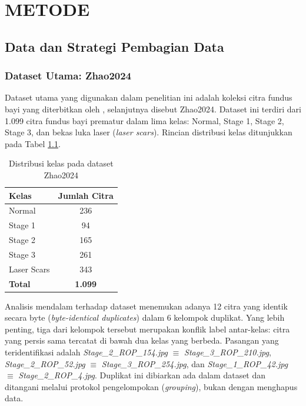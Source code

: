 
\chapter{METODE}

\section{Data dan Strategi Pembagian Data}

\subsection{Dataset Utama: Zhao2024}

Dataset utama yang digunakan dalam penelitian ini adalah koleksi citra fundus bayi yang
diterbitkan oleh \citet{Zhao2024}, selanjutnya disebut Zhao2024. Dataset ini terdiri dari
1.099 citra fundus bayi prematur dalam lima kelas: Normal, Stage 1, Stage 2, Stage 3, dan
bekas luka laser (\textit{laser scars}). Rincian distribusi kelas ditunjukkan pada Tabel
\ref{tab:distribusi_kelas}.

\begin{table}[H]
\centering
\caption{Distribusi kelas pada dataset Zhao2024}
\label{tab:distribusi_kelas}
\begin{tabular}{l c}
\toprule
\textbf{Kelas} & \textbf{Jumlah Citra} \\
\midrule
Normal            & 236  \\
Stage 1           & 94   \\
Stage 2           & 165  \\
Stage 3           & 261  \\
Laser Scars       & 343  \\
\midrule
\textbf{Total}    & \textbf{1.099} \\
\bottomrule
\end{tabular}
\end{table}

Analisis mendalam terhadap dataset menemukan adanya 12 citra yang identik secara byte
(\textit{byte-identical duplicates}) dalam 6 kelompok duplikat. Yang lebih penting, tiga
dari kelompok tersebut merupakan konflik label antar-kelas: citra yang persis sama tercatat
di bawah dua kelas yang berbeda. Pasangan yang teridentifikasi adalah \textit{Stage\_2\_ROP\_154.jpg}
$\equiv$ \textit{Stage\_3\_ROP\_210.jpg}, \textit{Stage\_2\_ROP\_52.jpg} $\equiv$
\textit{Stage\_3\_ROP\_254.jpg}, dan \textit{Stage\_1\_ROP\_42.jpg} $\equiv$
\textit{Stage\_2\_ROP\_4.jpg}. Duplikat ini dibiarkan ada dalam dataset dan ditangani melalui
protokol pengelompokan (\textit{grouping}), bukan dengan menghapus data.

